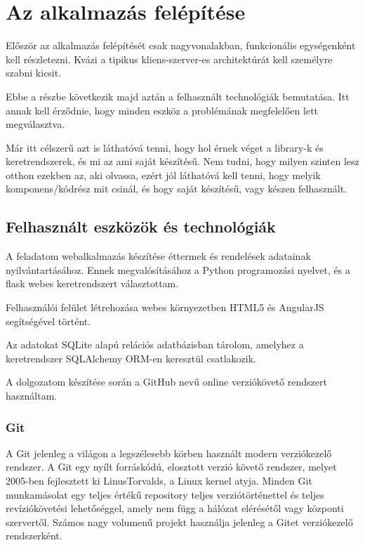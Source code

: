 \chapter{Az alkalmazás felépítése}

Először az alkalmazás felépítését csak nagyvonalakban, funkcionális egységenként kell részletezni. Kvázi a tipikus kliens-szerver-es architektúrát kell személyre szabni kicsit.

Ebbe a részbe következik majd aztán a felhasznált technológiák bemutatása. Itt annak kell érződnie, hogy minden eszköz a problémának megfelelően lett megválasztva.

Már itt célszerű azt is láthatóvá tenni, hogy hol érnek véget a library-k és keretrendszerek, és mi az ami saját készítésű. Nem tudni, hogy milyen szinten lesz otthon ezekben az, aki olvassa, ezért jól láthatóvá kell tenni, hogy melyik komponens/kódrész mit csinál, és hogy saját készítésű, vagy készen felhasznált.

\section{Felhasznált eszközök és technológiák}

A feladatom webalkalmazás készítése éttermek és rendelések adatainak nyilvántartásához. Ennek megvalósításához a Python programozási nyelvet, és a flask webes keretrendszert választottam.

Felhasználói felület létrehozása webes környezetben HTML5 és AngularJS segítségével történt.

Az adatokat SQLite alapú relációs adatbázisban tárolom, amelyhez a keretrendszer SQLAlchemy ORM-en keresztül csatlakozik. 

A dolgozatom készítése során a GitHub nevű online verziókövető rendszert használtam.

\subsection{Git}

A Git jelenleg a világon a legszélesebb körben használt modern verziókezelő rendszer. A Git egy nyílt forráskódú, elosztott verzió követő rendszer, melyet 2005-ben fejlesztett ki LinusTorvalds, a Linux kernel atyja. Minden Git munkamásolat egy teljes értékű repository teljes verziótörténettel és teljes revíziókövetési lehetőséggel, amely nem függ a hálózat elérésétől vagy központi szervertől. Számos nagy volumenű projekt használja jelenleg a Gitet verziókezelő rendszerként.

